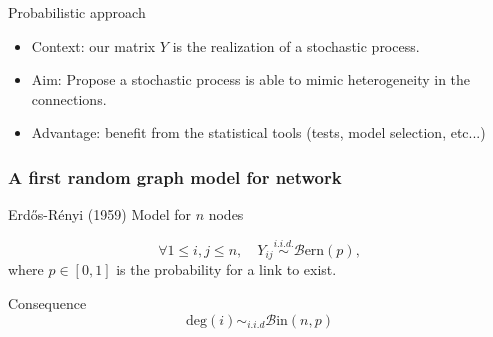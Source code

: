 \documentclass[compress,10pt]{beamer}
\begin{document}
\begin{frame}{Probabilistic approach}
\begin{itemize}
\item 
\alert{Context}: our   matrix $Y$ is the realization of a stochastic process.
\item 
\alert{Aim}: Propose a  stochastic process is able to mimic heterogeneity in the connections.  
\item \alert{Advantage}: benefit from the statistical tools (tests,  model selection, etc...)  
\end{itemize}


\end{frame}

\begin{frame}\frametitle{A first random graph model for network}
\textcolor{mygreen}{Erd\H{o}s-Rényi (1959)} Model for $n$ nodes 

$$\forall 1\le i,j\le n,\quad Y_{ij}\overset{i.i.d.}{\sim} \mathcal{B}\mbox{ern} (p),$$
where  $p\in[0,1]$ is the  probability for a link to exist. 

\vspace{1em}

\alert{Consequence} $$\mbox{deg}(i) \sim_{i.i.d} \mathcal{B}\mbox{in}(n,p)$$

\end{frame}
\end{document}
